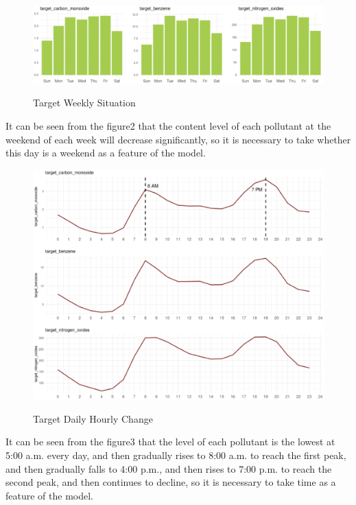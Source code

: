 \begin{figure}[H]
	\centering
	\includegraphics[scale=0.3]{figures//p9.eps}\\
	\caption{Target Weekly Situation}\label{fig:Target Weekly Situation}
\end{figure}
It can be seen from the figure2 that the content level of each pollutant at the weekend of each week will decrease significantly, so it is necessary to take whether this day is a weekend as a feature of the model.

\begin{figure}[H]
	\centering
	\includegraphics[scale=0.3]{figures//p5.eps}\\
	\caption{Target Daily Hourly Change}\label{fig:Target Daily Hourly Change}
\end{figure}
It can be seen from the figure3 that the level of each pollutant is the lowest at 5:00 a.m. every day, and then gradually rises to 8:00 a.m. to reach the first peak, and then gradually falls to 4:00 p.m., and then rises to 7:00 p.m. to reach the second peak, and then continues to decline, so it is necessary to take time as a feature of the model.




